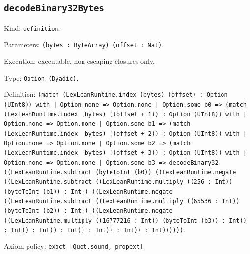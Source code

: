 \documentclass[11pt]{article}
\begin{document}
\subsection*{\texttt{decodeBinary32Bytes}}
\noindent Kind: \texttt{definition}.\par
\noindent Parameters: \texttt{(bytes : ByteArray) (offset : Nat)}.\par
\noindent Execution: executable, non-escaping closures only.\par
\noindent Type: \texttt{Option (Dyadic)}.\par
\noindent Definition: \texttt{(match (LexLeanRuntime.index (bytes) (offset) : Option (UInt8)) with | Option.none => Option.none | Option.some b0 => (match (LexLeanRuntime.index (bytes) ((offset + 1)) : Option (UInt8)) with | Option.none => Option.none | Option.some b1 => (match (LexLeanRuntime.index (bytes) ((offset + 2)) : Option (UInt8)) with | Option.none => Option.none | Option.some b2 => (match (LexLeanRuntime.index (bytes) ((offset + 3)) : Option (UInt8)) with | Option.none => Option.none | Option.some b3 => decodeBinary32 ((LexLeanRuntime.subtract (byteToInt (b0)) ((LexLeanRuntime.negate ((LexLeanRuntime.subtract ((LexLeanRuntime.multiply ((256 : Int)) (byteToInt (b1)) : Int)) ((LexLeanRuntime.negate ((LexLeanRuntime.subtract ((LexLeanRuntime.multiply ((65536 : Int)) (byteToInt (b2)) : Int)) ((LexLeanRuntime.negate ((LexLeanRuntime.multiply ((16777216 : Int)) (byteToInt (b3)) : Int)) : Int)) : Int)) : Int)) : Int)) : Int)) : Int))))))}.\par
\noindent Axiom policy: \texttt{exact [Quot.sound, propext]}.\par
\end{document}
